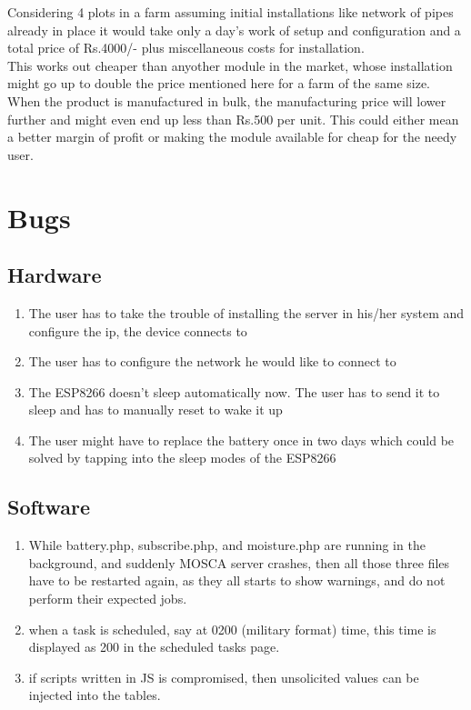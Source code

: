 \documentclass[16pt]{article}
\begin{document}
Considering 4 plots in a farm assuming initial installations like network of pipes already in place it would take only a day's work of setup and configuration 
and a total price of Rs.4000/- plus miscellaneous costs for installation.\\

This works out cheaper than anyother module in the market, whose installation might go up to double the price mentioned here for a farm of the same size.
When the product is manufactured in bulk, the manufacturing price will lower further and might even end up less than Rs.500 per unit. This could
either mean a better margin of profit or making the module available for cheap for the needy user.  


\vspace{15cm}
\section{Bugs}

\vspace{0.5cm}

\subsection{Hardware}
\begin{enumerate}
 \item The user has to take the trouble of installing the server in his/her system and configure the ip, the device connects to
 \item The user has to configure the network he would like to connect to 
 \item The ESP8266 doesn't sleep automatically now. The user has to send it to sleep and has to manually reset to wake it up
 \item The user might have to replace the battery once in two days which could be solved by tapping into the sleep modes of the ESP8266
\end{enumerate}

\vspace{0.5cm}

\subsection{Software}
\begin{enumerate}
 \item While battery.php, subscribe.php, and moisture.php are running in the background, and suddenly MOSCA server crashes, then all those three files have to be restarted again, as they all starts to show warnings, and do not perform their expected jobs.
 \item when a task is scheduled, say at 0200 (military format) time, this time is displayed as 200 in the scheduled tasks page.
 \item if scripts written in JS is compromised, then unsolicited values can be injected into the tables.
\end{enumerate}
\end{document}
